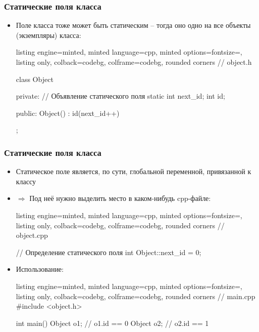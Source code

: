 \documentclass[10pt]{beamer}
\begin{document}
\begin{frame}[fragile]
\frametitle{Статические поля класса}
\begin{itemize}
\item Поле класса тоже может быть статическим -- тогда оно одно на все объекты (экземпляры) класса:
\begin{tcblisting}{listing engine=minted, minted language=cpp, minted options={fontsize=\scriptsize}, listing only, colback=codebg, colframe=codebg, rounded corners}
// object.h

class Object {
private:
  // Объявление статического поля
  static int next_id;
  int id;

public:
  Object()
    : id(next_id++)
  {}
};
\end{tcblisting}
\end{itemize}
\end{frame}

\begin{frame}[fragile]
\frametitle{Статические поля класса}
\begin{itemize}
\item Статическое поле является, по сути, глобальной переменной, привязанной к классу
\pause
\item \(\Longrightarrow\) Под неё нужно выделить место в каком-нибудь cpp-файле:
\begin{tcblisting}{listing engine=minted, minted language=cpp, minted options={fontsize=\scriptsize}, listing only, colback=codebg, colframe=codebg, rounded corners}
// object.cpp

// Определение статического поля
int Object::next_id = 0;
\end{tcblisting}
\pause
\item Использование:
\begin{tcblisting}{listing engine=minted, minted language=cpp, minted options={fontsize=\scriptsize}, listing only, colback=codebg, colframe=codebg, rounded corners}
// main.cpp
#include <object.h>

int main() {
  Object o1; // o1.id == 0
  Object o2; // o2.id == 1
}
\end{tcblisting}
\end{itemize}
\end{frame}
\end{document}

